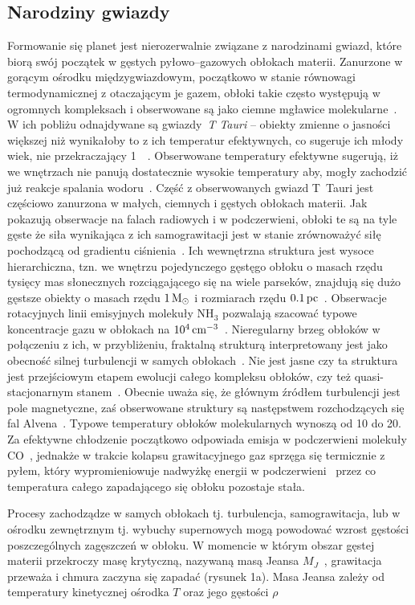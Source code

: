 \subsection{Narodziny gwiazdy}
Formowanie się planet jest nierozerwalnie związane z narodzinami gwiazd, które
biorą swój początek w gęstych pyłowo--gazowych obłokach materii. Zanurzone w
gorącym ośrodku międzygwiazdowym, początkowo w stanie równowagi termodynamicznej
z otaczającym je gazem, obłoki takie często występują w ogromnych kompleksach i
obserwowane są jako ciemne mgławice molekularne~\cite{Tielens05}. W ich pobliżu
odnajdywane są gwiazdy~\emph{T Tauri} -- obiekty zmienne o jasności większej niż
wynikałoby to z ich temperatur efektywnych, co sugeruje ich młody wiek, nie
przekraczający 1~\Myr~\cite{H62}. Obserwowane temperatury efektywne sugerują, iż
we wnętrzach nie panują dostatecznie wysokie temperatury aby, mogły zachodzić
już reakcje spalania wodoru~\cite{CK79}. Część z obserwowanych gwiazd T~Tauri
jest częściowo zanurzona w małych, ciemnych i gęstych obłokach materii. Jak
pokazują obserwacje na falach radiowych i w podczerwieni, obłoki te są na tyle
gęste że siła wynikająca z ich samograwitacji jest w stanie zrównoważyć siłę
pochodzącą od gradientu ciśnienia~\cite{WT02}. Ich wewnętrzna struktura jest
wysoce hierarchiczna, tzn. we wnętrzu pojedynczego gęstęgo obłoku o masach rzędu
tysięcy mas słonecznych rozciągającego się na wiele parseków, znajdują się dużo
gęstsze obiekty o masach rzędu $1\hbox{$\mathrm{\thinspace M_{\odot}}$}$ i rozmiarach rzędu $0.1\hbox{$\thinspace\textrm{pc}$}$~\cite{M85,
LSM93}. Obserwacje rotacyjnych linii emisyjnych molekuły NH$_3$ pozwalają
szacować typowe koncentracje gazu w obłokach na $10^{4}\hbox{$\thinspace\textrm{cm}$}^{-3}$~\cite{BM89}.
Nieregularny brzeg obłoków w połączeniu z ich, w przybliżeniu,
fraktalną strukturą interpretowany jest jako obecność silnej turbulencji w
samych obłokach~\cite{E00, FPW91}. Nie jest jasne czy ta struktura jest
przejściowym etapem ewolucji całego kompleksu obłoków, czy też
quasi-stacjonarnym stanem~\cite{L94}. Obecnie uważa się, że głównym źródłem
turbulencji jest pole magnetyczne, zaś obserwowane struktury są następstwem
rozchodzących się fal Alvena~\cite{NP03, MLK04}.
Typowe temperatury obłoków molekularnych wynoszą od 10 do 20\K. Za efektywne
chłodzenie początkowo odpowiada emisja w podczerwieni molekuły CO~\cite{MSWG82},
jednakże w trakcie kolapsu grawitacyjnego gaz sprzęga się termicznie z pyłem,
który wypromieniowuje nadwyżkę energii w podczerwieni~\cite{HN65, MI00} przez co
temperatura całego zapadającego się obłoku pozostaje stała.

\par Procesy zachodządze w samych obłokach tj. turbulencja, samograwitacja, lub
w ośrodku zewnętrznym tj.  wybuchy supernowych mogą powodować wzrost gęstości
poszczególnych zagęszczeń w obłoku. W momencie w którym obszar gęstej materii
przekroczy  masę krytyczną, nazywaną masą Jeansa $M_J$~\cite{J1902, J1928},
grawitacja przeważa i chmura zaczyna się zapadać (rysunek 1a). Masa Jeansa
zależy od temperatury kinetycznej ośrodka $T$ oraz jego gęstości
$\rho$~\cite{H64} 

